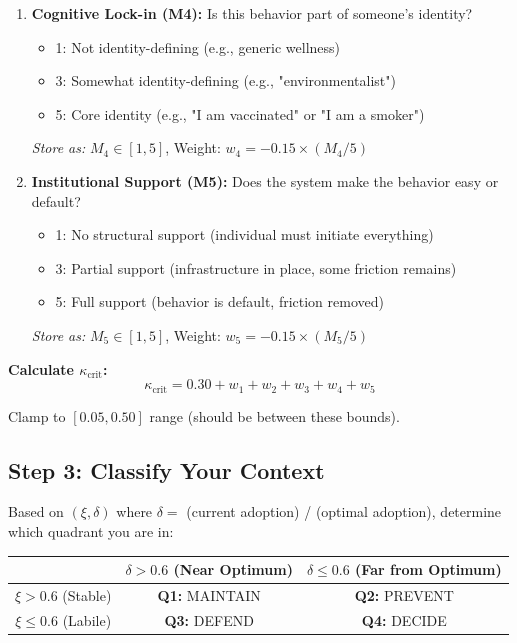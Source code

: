 \documentclass[11pt, a4paper]{article}
\begin{document}
\begin{enumerate}
    \item \textbf{Cognitive Lock-in (M4):}
    Is this behavior part of someone's identity?
    \begin{itemize}
        \item 1: Not identity-defining (e.g., generic wellness)
        \item 3: Somewhat identity-defining (e.g., "environmentalist")
        \item 5: Core identity (e.g., "I am vaccinated" or "I am a smoker")
    \end{itemize}
    \textit{Store as:} $M_4 \in [1, 5]$, Weight: $w_4 = -0.15 \times (M_4/5)$

    \item \textbf{Institutional Support (M5):}
    Does the system make the behavior easy or default?
    \begin{itemize}
        \item 1: No structural support (individual must initiate everything)
        \item 3: Partial support (infrastructure in place, some friction remains)
        \item 5: Full support (behavior is default, friction removed)
    \end{itemize}
    \textit{Store as:} $M_5 \in [1, 5]$, Weight: $w_5 = -0.15 \times (M_5/5)$
\end{enumerate}

\noindent
\textbf{Calculate $\kappa_{\text{crit}}$:}
\begin{equation}
\kappa_{\text{crit}} = 0.30 + w_1 + w_2 + w_3 + w_4 + w_5
\end{equation}

\noindent
Clamp to $[0.05, 0.50]$ range (should be between these bounds).

\subsection{Step 3: Classify Your Context}

Based on $(\xi, \delta)$ where $\delta = $ (current adoption) / (optimal adoption),
determine which quadrant you are in:

\begin{center}
\begin{tabular}{|c|c|c|}
\hline
& $\delta > 0.6$ (Near Optimum) & $\delta \leq 0.6$ (Far from Optimum) \\
\hline
$\xi > 0.6$ (Stable) & \textbf{Q1:} MAINTAIN & \textbf{Q2:} PREVENT \\
$\xi \leq 0.6$ (Labile) & \textbf{Q3:} DEFEND & \textbf{Q4:} DECIDE \\
\hline
\end{tabular}
\end{center}
\end{document}
